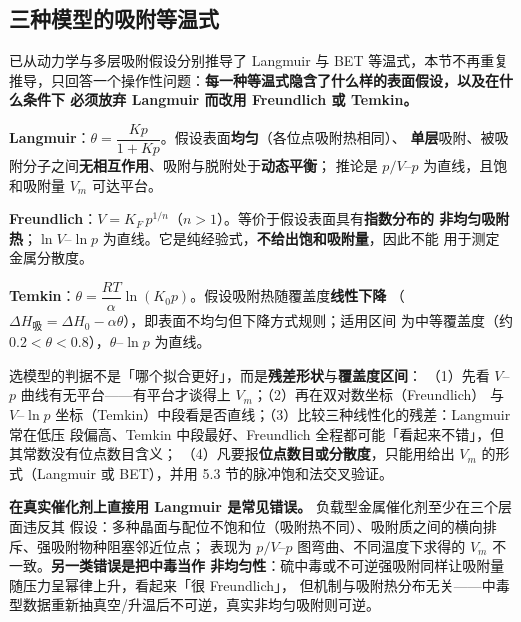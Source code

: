 \subsection{三种模型的吸附等温式}

 已从动力学与多层吸附假设分别推导了 Langmuir 与 BET 等温式，本节不再重复
推导，只回答一个操作性问题：\textbf{每一种等温式隐含了什么样的表面假设，以及在什么条件下
必须放弃 Langmuir 而改用 Freundlich 或 Temkin。}

\begin{principle}
\textbf{Langmuir}：$\theta = \dfrac{Kp}{1+Kp}$。假设表面\textbf{均匀}（各位点吸附热相同）、
\textbf{单层}吸附、被吸附分子之间\textbf{无相互作用}、吸附与脱附处于\textbf{动态平衡}；
推论是 $p/V$–$p$ 为直线，且饱和吸附量 $V_m$ 可达平台。

\textbf{Freundlich}：$V = K_F\,p^{1/n}$（$n>1$）。等价于假设表面具有\textbf{指数分布的
非均匀吸附热}；$\ln V$–$\ln p$ 为直线。它是纯经验式，\textbf{不给出饱和吸附量}，因此不能
用于测定金属分散度。

\textbf{Temkin}：$\theta = \dfrac{RT}{\alpha}\ln(K_0 p)$。假设吸附热随覆盖度\textbf{线性下降}
（$\Delta H_{\text{吸}} = \Delta H_0 - \alpha\theta$），即表面不均匀但下降方式规则；适用区间
为中等覆盖度（约 $0.2<\theta<0.8$），$\theta$–$\ln p$ 为直线。
\end{principle}

\begin{dataflow}
选模型的判据不是「哪个拟合更好」，而是\textbf{残差形状}与\textbf{覆盖度区间}：
（1）先看 $V$–$p$ 曲线有无平台——有平台才谈得上 $V_m$；（2）再在双对数坐标（Freundlich）
与 $V$–$\ln p$ 坐标（Temkin）中段看是否直线；（3）比较三种线性化的残差：Langmuir 常在低压
段偏高、Temkin 中段最好、Freundlich 全程都可能「看起来不错」，但其常数没有位点数目含义；
（4）凡要报\textbf{位点数目或分散度}，只能用给出 $V_m$ 的形式（Langmuir 或 BET），并用
5.3 节的脉冲饱和法交叉验证。
\end{dataflow}

\begin{pitfall}
\textbf{在真实催化剂上直接用 Langmuir 是常见错误。} 负载型金属催化剂至少在三个层面违反其
假设：多种晶面与配位不饱和位（吸附热不同）、吸附质之间的横向排斥、强吸附物种阻塞邻近位点；
表现为 $p/V$–$p$ 图弯曲、不同温度下求得的 $V_m$ 不一致。\textbf{另一类错误是把中毒当作
非均匀性}：硫中毒或不可逆强吸附同样让吸附量随压力呈幂律上升，看起来「很 Freundlich」，
但机制与吸附热分布无关——中毒型数据重新抽真空/升温后不可逆，真实非均匀吸附则可逆。
\end{pitfall}

